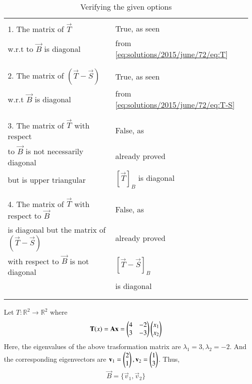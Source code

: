 \begin{longtable}{|l|l|}
    \hline
        & \\
        1. The matrix of $\vec{T}$ & True, as seen\\
        w.r.t to $\vec{B}$ is diagonal & from \eqref{eq:solutions/2015/june/72/eq:T}\\
        & \\
    \hline
        & \\
        2. The matrix of $(\vec{T}-\vec{S})$ & True, as seen\\
        w.r.t $\vec{B}$ is diagonal & from \eqref{eq:solutions/2015/june/72/eq:T-S}\\
        & \\
    \hline
        & \\
        3. The matrix of $\vec{T}$ with respect & False, as\\
        to $\vec{B}$ is not necessarily diagonal & already proved\\
        but is upper triangular & $[\vec{T}]_B$ is diagonal\\
        & \\
    \hline
        & \\
        4. The matrix of $\vec{T}$ with respect to $\vec{B}$ & False, as\\
        is diagonal but the matrix of $(\vec{T}-\vec{S})$ & already proved\\
        with respect to $\vec{B}$ is not diagonal & $[\vec{T}-\vec{S}]_B$\\
        & is diagonal\\
        & \\
    \hline
    \caption{Verifying the given options}
    \label{eq:solutions/2015/june/72/tab:proof}
\end{longtable}
\twocolumn
Let $T:\mathbb R^2 \rightarrow \mathbb R^2$ where
\begin{align}
    \mathbf{T}(x) = \mathbf{A}\mathbf{x} = \begin{pmatrix}4 & -2 \\ 3 & -3\end{pmatrix}\begin{pmatrix}x_1 \\ x_2\end{pmatrix}
\end{align}
Here, the eigenvalues of the above trasformation matrix are $\lambda_1 = 3, \lambda_2 = -2$. And the corresponding eigenvectors are $\mathbf{v}_1 = \begin{pmatrix}2\\1\end{pmatrix}, \mathbf{v}_2 = \begin{pmatrix}1\\3\end{pmatrix}$. Thus,
\begin{align}
    \vec{B} = \{ \vec{v}_1, \vec{v}_2 \}
\end{align}
